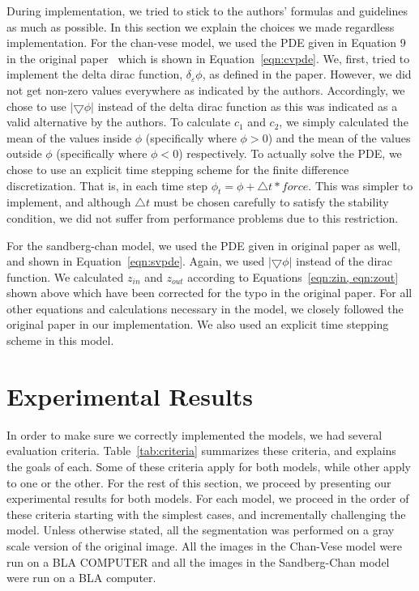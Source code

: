 \documentclass[10pt,twocolumn,letterpaper]{article}
\begin{document}
During implementation, we tried to stick to the authors' formulas and guidelines as much as possible. In this section we explain the choices we made regardless
implementation. For the chan-vese model, we used the PDE given in Equation 9 in the original paper~\cite{chan2001active} which is shown in
Equation~\ref{eqn:cvpde}.  We, first, tried to implement the delta dirac function, $\delta_{\varepsilon}\phi$, as defined in the paper. However, we did not
get non-zero values everywhere as indicated by the authors. Accordingly, we chose to use $|\bigtriangledown\phi|$ instead of the delta dirac function as this
was indicated as a valid alternative by the authors. To calculate $c_{1}$ and $c_{2}$, we simply calculated the mean of the values inside $\phi$ (specifically
where $\phi > 0$) and the mean of the values outside $\phi$ (specifically where $\phi < 0$) respectively. To actually solve the PDE, we chose to use an explicit
time stepping scheme for the finite difference discretization. That is, in each time step $\phi_{t} = \phi + \triangle t*force$. This was simpler to implement,
and although $\triangle t$ must be chosen carefully to satisfy the stability condition, we did not suffer from performance problems due to this restriction.

For the sandberg-chan model, we used the PDE given in original paper as well, and shown in Equation~\ref{eqn:svpde}. Again, we used $|\bigtriangledown\phi|$
instead of the dirac function. We calculated $z_{in}$ and $z_{out}$ according to Equations~\ref{eqn:zin, eqn:zout} shown above which have been corrected for
the typo in the original paper. For all other equations and calculations necessary in the model, we closely followed the original paper in our implementation.
We also used an explicit time stepping scheme in this model. 


\section{Experimental Results}
\label{sec:results}

In order to make sure we correctly implemented the models, we had several evaluation criteria. Table~\ref{tab:criteria} summarizes these criteria, and explains
the goals of each. Some of these criteria apply for both models, while other apply to one or the other. For the rest of this section, we proceed by presenting
our experimental results for both models. For each model, we proceed in the order of these criteria starting with the simplest
cases, and incrementally challenging the model. Unless otherwise stated, all the segmentation was performed on a gray scale version of the original image. All
the images in the Chan-Vese model were run on a BLA COMPUTER and all the images in the Sandberg-Chan model were run on a BLA computer.
\end{document}
